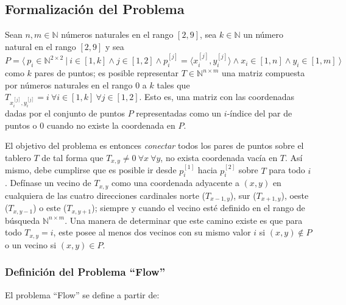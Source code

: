\documentclass[letter,12pt]{article}
\begin{document}
\subsection{Formalización del Problema} \label{analisis:formalizacion}

Sean $n, m \in \mathbb{N}$ números naturales en el rango $[2, 9]$, sea $k \in \mathbb{N}$ un número natural en el rango $[2, 9]$ y sea $P = \langle ~ p_i \in \mathbb{N}^{2 \times 2} ~ | ~ i \in [1, k] \land j \in [1, 2] \land p_i^{[j]} = \langle x_i^{[j]}, y_i^{[j]} \rangle \land x_i \in [1,n] \land y_i \in [1,m] ~ \rangle$ como $k$ pares de puntos; es posible representar $T \in \mathbb{N}^{n \times m}$ una matriz compuesta por números naturales en el rango $0$ a $k$ tales que $T_{x_i^{[j]}, y_i^{[j]}} = i ~ \forall i \in [1, k] ~ \forall j \in [1, 2]$. Esto es, una matriz con las coordenadas dadas por el conjunto de puntos $P$ representadas como un $i$-índice del par de puntos o $0$ cuando no existe la coordenada en $P$. \par

El objetivo del problema es entonces \textit{conectar} todos los pares de puntos sobre el tablero $T$ de tal forma que $T_{x,y} \neq 0 ~ \forall x ~ \forall y$, no exista coordenada vacía en $T$. Así mismo, debe cumplirse que es posible ir desde $p_i^{[1]}$ hacia $p_i^{[2]}$ sobre $T$ para todo $i$. Defínase un vecino de $T_{x,y}$ como una coordenada adyacente a $(x,y)$ en cualquiera de las cuatro direcciones cardinales norte ($T_{x-1,y}$), sur ($T_{x+1,y}$), oeste ($T_{x,y-1}$) o este ($T_{x,y+1}$); siempre y cuando el vecino esté definido en el rango de búsqueda $\mathbb{N}^{n \times m}$. Una manera de determinar que este camino existe es que para todo $T_{x,y}=i$, este posee al menos dos vecinos con su mismo valor $i$ si $(x,y) \notin P$ o un vecino si $(x,y) \in P$. \par

\subsubsection{Definición del Problema ``Flow''} \label{analisis:formalizacion:definicion}

El problema ``Flow'' se define a partir de: \par
\end{document}
